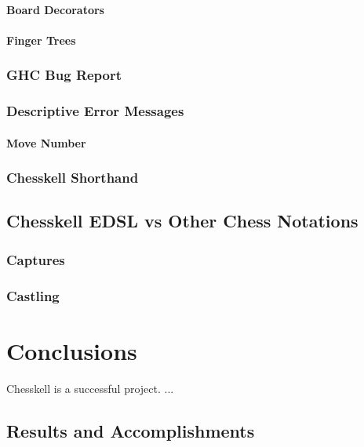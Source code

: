 \documentclass[12pt, a4paper, bibliography=totocnumbered]{scrreprt}
\begin{document}
\subsubsection{Board Decorators}

\subsubsection{Finger Trees}

\subsection{GHC Bug Report}

\subsection{Descriptive Error Messages}

\subsubsection{Move Number}

\subsection{Chesskell Shorthand}

\section{Chesskell EDSL vs Other Chess Notations}

\subsection{Captures}

\subsection{Castling}


\chapter{Conclusions}

Chesskell is a successful project. ...

\section{Results and Accomplishments}
\end{document}
